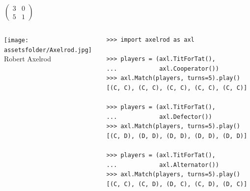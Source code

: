 \documentclass{beamer}
\newcommand{\assetsfolder}{./assets}
\begin{document}
	\begin{frame}
		\fontsize{74}{65}\selectfont
		\begin{center}
			\(
				\begin{pmatrix}
					3 & 0\\
					5 & 1
				\end{pmatrix}
			\)
		\end{center}

	\end{frame}

	\begin{frame}[fragile]{}
		\begin{columns}
			\begin{column}{.4\textwidth}
				\begin{center}
					\texttt{[image: \\assetsfolder/Axelrod.jpg]}
					\\
					Robert Axelrod
				\end{center}
			\end{column}
			\pause
			\begin{column}{.6\textwidth}
				\begin{verbatim}
>>> import axelrod as axl

>>> players = (axl.TitForTat(),
...            axl.Cooperator())
>>> axl.Match(players, turns=5).play()
[(C, C), (C, C), (C, C), (C, C), (C, C)]

>>> players = (axl.TitForTat(),
...            axl.Defector())
>>> axl.Match(players, turns=5).play()
[(C, D), (D, D), (D, D), (D, D), (D, D)]

>>> players = (axl.TitForTat(),
...            axl.Alternator())
>>> axl.Match(players, turns=5).play()
[(C, C), (C, D), (D, C), (C, D), (D, C)]

				\end{verbatim}
			\end{column}
		\end{columns}



\end{frame}
\end{document}
